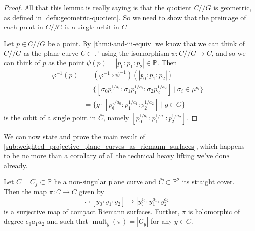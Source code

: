 \documentclass[10pt,notitlepage]{article}
\numberwithin{equation}{subsection}
\DeclareMathOperator{\mult}{mult}
\newcommand{\pee}{\mathbb{P}}
\newcommand{\cover}[1]{\overline{#1}}
\newcommand{\sslash}{/\!\!/}
\begin{document}
        \begin{proof}
            All that this lemma is really saying is that the quotient $\cover{C}\sslash G$ is geometric, as defined in \cref{defn:geometric-quotient}.
            So we need to show that the preimage of each point in $\cover{C}\sslash G$ is a single orbit in $\cover{C}$.

            Let $p\in\cover{C}\sslash G$ be a point.
            By \cref{thm:i-and-iii-equiv} we know that we can think of $\cover{C}\sslash G$ as the plane curve $C\subset\pee$ using the isomorphism $\psi\colon\cover{C}\sslash G\to C$, and so we can think of $p$ as the point $\psi(p)=|p_0:p_1:p_2|\in\pee$.
            Then
            \begin{align*}
                \varphi^{-1}(p) &= (\varphi^{-1}\circ\psi^{-1})(|p_0:p_1:p_2|) \\
                &= \{[\sigma_0 p_0^{1/a_0}:\sigma_1 p_1^{1/a_1}:\sigma_2 p_2^{1/a_2}] \mid \sigma_i\in\mu^{a_i}\} \\
                & = \{g\cdot[p_0^{1/a_0}:p_1^{1/a_1}:p_2^{1/a_2}] \mid g\in G\}
            \end{align*}
            is the orbit of a single point in $\cover{C}$, namely $[p_0^{1/a_0}:p_1^{1/a_1}:p_2^{1/a_2}]$.
        \end{proof}

        We can now state and prove the main result of \cref{sub:weighted_projective_plane_curves_as_riemann_surfaces}, which happens to be no more than a corollary of all the technical heavy lifting we've done already.

        \begin{corollary}\label{cor:quotient-set-up-with-pi-etc}
            Let $C=C_f\subset\pee$ be a non-singular plane curve and $\cover{C}\subset\pee^2$ its straight cover.
            Then the map $\pi\colon\cover{C}\to C$ given by
            \[
                \pi\colon[y_0:y_1:y_2]\mapsto|y_0^{a_0}:y_1^{a_1}:y_2^{a_2}|
            \]
            is a surjective map of compact Riemann surfaces.
            Further, $\pi$ is holomorphic of degree $a_0a_1a_2$ and such that $\mult_y(\pi)=|G_y|$ for any $y\in\cover{C}$.
        \end{corollary}
\end{document}
